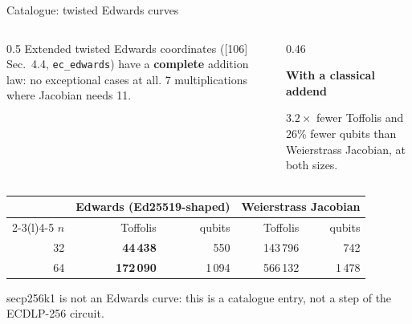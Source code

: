 \documentclass[aspectratio=169,11pt]{beamer}
\newcommand{\peachtitle}[1]{{\bfseries\color{cverm}#1}\par\vskip1mm}
\begin{document}
\setcounter{framenumber}{200}
\begin{frame}{Catalogue: twisted Edwards curves}
  \begin{columns}[c]
    \begin{column}{0.5\textwidth}
      \small Extended twisted Edwards coordinates ([106] Sec.~4.4, \texttt{ec\_edwards}) have a \textbf{complete} addition law: no exceptional cases at all.
      \vskip2mm
      7 multiplications where Jacobian needs 11.
    \end{column}
    \begin{column}{0.46\textwidth}
      \begin{peachblock}[fontupper=\small]\peachtitle{With a classical addend}
        $3.2\times$ fewer Toffolis and $26\%$ fewer qubits than Weierstrass Jacobian, at both sizes.
      \end{peachblock}
    \end{column}
  \end{columns}
  \vskip4mm
  \centering\footnotesize
  \renewcommand{\arraystretch}{1.15}
  \begin{tabular}{@{}rrrrr@{}}
    \toprule
    & \multicolumn{2}{c}{Edwards (Ed25519-shaped)} & \multicolumn{2}{c}{Weierstrass Jacobian} \\
    \cmidrule(lr){2-3}\cmidrule(l){4-5}
    $n$ & Toffolis & qubits & Toffolis & qubits \\
    \midrule
    32 & \textbf{44\,438} & 550 & 143\,796 & 742 \\
    64 & \textbf{172\,090} & 1\,094 & 566\,132 & 1\,478 \\
    \bottomrule
  \end{tabular}\par
  \vskip2mm
  {\scriptsize secp256k1 is not an Edwards curve: this is a catalogue entry, not a step of the ECDLP-256 circuit.}
\end{frame}
\end{document}
